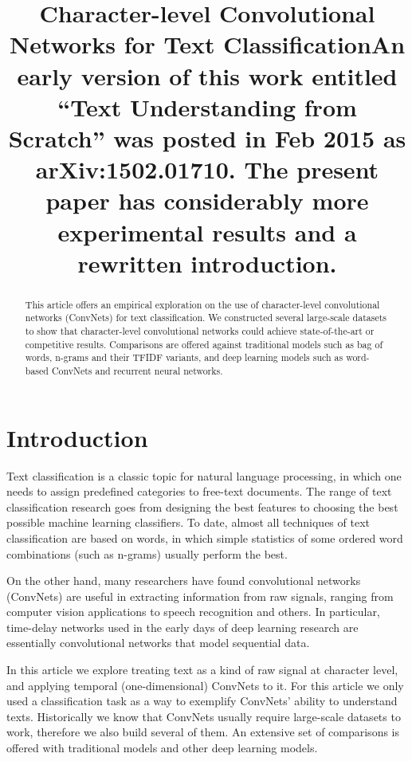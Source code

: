 \title{Character-level Convolutional Networks for Text ClassificationAn early version of this work entitled ``Text Understanding from Scratch'' was posted in Feb 2015 as arXiv:1502.01710. The present paper has considerably more experimental results and a rewritten introduction.}

\begin{abstract}
This article offers an empirical exploration on the use of character-level convolutional networks (ConvNets) for text classification. We constructed several large-scale datasets to show that character-level convolutional networks could achieve state-of-the-art or competitive results. Comparisons are offered against traditional models such as bag of words, n-grams and their TFIDF variants, and deep learning models such as word-based ConvNets and recurrent neural networks.
\end{abstract}

\section{Introduction}

Text classification is a classic topic for natural language processing, in which one needs to assign predefined categories to free-text documents. The range of text classification research goes from designing the best features to choosing the best possible machine learning classifiers. To date, almost all techniques of text classification are based on words, in which simple statistics of some ordered word combinations (such as n-grams) usually perform the best\cite{J98}.

On the other hand, many researchers have found convolutional networks (ConvNets)\cite{LBDHHHJ89}\cite{LBBH98} are useful in extracting information from raw signals, ranging from computer vision applications to speech recognition and others. In particular, time-delay networks used in the early days of deep learning research are essentially convolutional networks that model sequential data\cite{BFBL89}\cite{WHHSL89}.

In this article we explore treating text as a kind of raw signal at character level, and applying temporal (one-dimensional) ConvNets to it. For this article we only used a classification task as a way to exemplify ConvNets' ability to understand texts. Historically we know that ConvNets usually require large-scale datasets to work, therefore we also build several of them. An extensive set of comparisons is offered with traditional models and other deep learning models.

